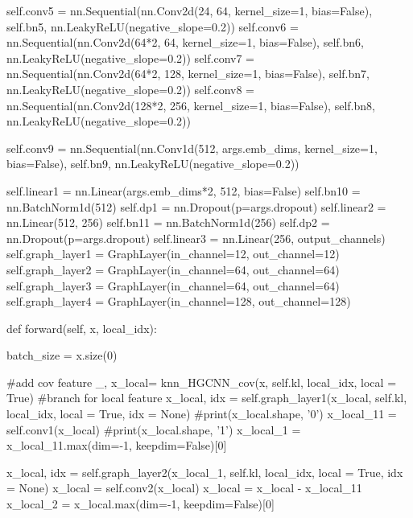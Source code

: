         
        self.conv5 = nn.Sequential(nn.Conv2d(24, 64, kernel_size=1, bias=False),
                                   self.bn5,
                                   nn.LeakyReLU(negative_slope=0.2))
        self.conv6 = nn.Sequential(nn.Conv2d(64*2, 64, kernel_size=1, bias=False),
                                   self.bn6,
                                   nn.LeakyReLU(negative_slope=0.2))
        self.conv7 = nn.Sequential(nn.Conv2d(64*2, 128, kernel_size=1, bias=False),
                                   self.bn7,
                                   nn.LeakyReLU(negative_slope=0.2))
        self.conv8 = nn.Sequential(nn.Conv2d(128*2, 256, kernel_size=1, bias=False),
                                   self.bn8,
                                   nn.LeakyReLU(negative_slope=0.2))
        
        
        self.conv9 = nn.Sequential(nn.Conv1d(512, args.emb_dims, kernel_size=1, bias=False),
                                   self.bn9,
                                   nn.LeakyReLU(negative_slope=0.2))
        
        self.linear1 = nn.Linear(args.emb_dims*2, 512, bias=False)
        self.bn10 = nn.BatchNorm1d(512)
        self.dp1 = nn.Dropout(p=args.dropout)
        self.linear2 = nn.Linear(512, 256)
        self.bn11 = nn.BatchNorm1d(256)
        self.dp2 = nn.Dropout(p=args.dropout)
        self.linear3 = nn.Linear(256, output_channels)
        self.graph_layer1 = GraphLayer(in_channel=12, out_channel=12)
        self.graph_layer2 = GraphLayer(in_channel=64, out_channel=64)
        self.graph_layer3 = GraphLayer(in_channel=64, out_channel=64)
        self.graph_layer4 = GraphLayer(in_channel=128, out_channel=128)

    def forward(self, x, local_idx):
        
        batch_size = x.size(0)

        #add cov feature
        _, x_local= knn_HGCNN_cov(x, self.kl, local_idx, local = True)
        #branch for local feature
        x_local, idx = self.graph_layer1(x_local, self.kl, local_idx, local = True, idx = None)
        #print(x_local.shape, '0')
        x_local_11 = self.conv1(x_local)
        #print(x_local.shape, '1')
        x_local_1 = x_local_11.max(dim=-1, keepdim=False)[0]
        
        x_local, idx = self.graph_layer2(x_local_1, self.kl, local_idx, local = True, idx = None)
        x_local = self.conv2(x_local)
        x_local = x_local - x_local_11
        x_local_2 = x_local.max(dim=-1, keepdim=False)[0]

